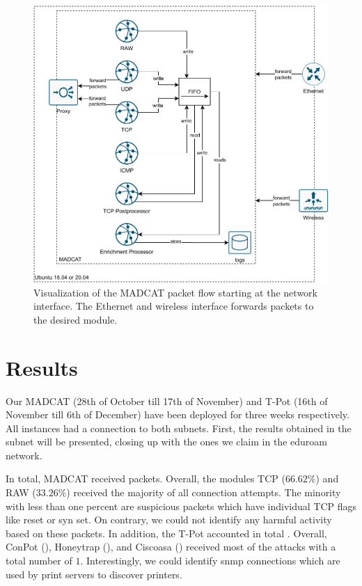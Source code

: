 \begin{figure}
    \centering
    \includegraphics[width=\textwidth]{figures/heicat-architecture.pdf}
    \caption[Visualization of the MADCAT packet flow]{Visualization of the MADCAT packet flow starting at the network interface. The Ethernet and wireless interface forwards packets to the desired module.}
    \label{fig:madcat-architecture}
\end{figure}

\section{Results}

Our MADCAT (28th of October till 17th of November) and T-Pot (16th of November till 6th of December) have been deployed for three weeks respectively.
All instances had a connection to both subnets.
First, the results obtained in the subnet  will be presented, closing up with the ones we claim in the eduroam network.

In total, MADCAT received  packets.
Overall, the modules TCP ($66.62\%$) and RAW ($33.26\%$) received the majority of all connection attempts.
The minority with less than one percent are suspicious packets which have individual TCP flags like reset or syn set. 
On contrary, we could not identify any harmful activity based on these packets.
In addition, the T-Pot accounted in total .
Overall, ConPot (), Honeytrap (), and Ciscoasa () received most of the attacks with a total number of $1$.
Interestingly, we could identify \ac{snmp} connections which are used by print servers to discover printers.


